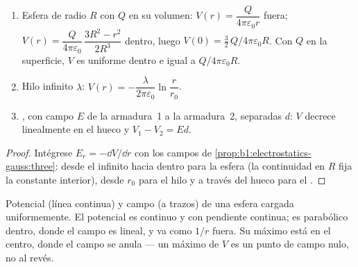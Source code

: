 \begin{proposition}\label{prop:b1:potential-capacitors:classic}
\begin{enumerate}
  \item Esfera de radio $R$ con $Q$ en su volumen: $V(r) = \dfrac{Q}{4\pi\varepsilon_0r}$
        fuera; $V(r) = \dfrac{Q}{4\pi\varepsilon_0}\,\dfrac{3R^2 - r^2}{2R^3}$
        dentro, luego $V(0) = \tfrac32\,Q/4\pi\varepsilon_0R$. Con $Q$ en la superficie,
        $V$ es uniforme dentro e igual a $Q/4\pi\varepsilon_0R$.
  \item Hilo infinito $\lambda$: $V(r) = -\dfrac{\lambda}{2\pi\varepsilon_0}\ln\dfrac{r}{r_0}$.
  \item {}, con campo $E$ de la armadura~1 a la
        armadura~2, separadas $d$: $V$ decrece linealmente en el hueco y $V_1 - V_2 = Ed$.
\end{enumerate}
\end{proposition}

\begin{proof}
Intégrese $E_r = -\dd V/\dd r$ con los campos de
\cref{prop:b1:electrostatics-gauss:three}: desde el infinito hacia dentro
para la esfera (la continuidad en $R$ fija la constante interior), desde
$r_0$ para el hilo y a través del hueco para el .
\end{proof}

\begin{omfigure}

{\small Potencial (línea continua) y campo (a trazos) de una esfera
cargada uniformemente. El potencial es continuo y con pendiente continua;
es parabólico dentro, donde el campo es lineal, y va como $1/r$ fuera. Su
máximo está en el centro, donde el campo se anula --- un máximo de $V$ es
un punto de campo nulo, no al revés.}
\end{omfigure}

